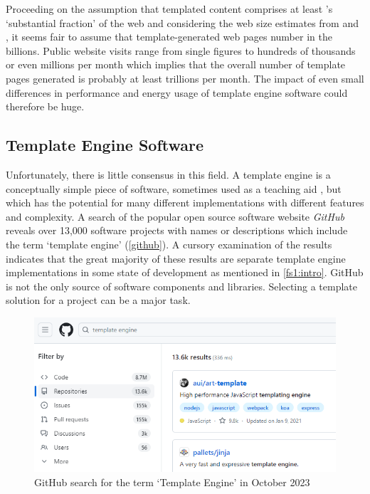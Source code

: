 Proceeding on the assumption that templated content comprises at least \citeauthor{Yang2008}'s  `substantial fraction' of the web and considering the web size estimates from \citet{Worldwidewebsize2018} and \citet{Kunder2008}, it seems fair to assume that template-generated web pages number in the billions. Public website visits range from single figures to hundreds of thousands or even millions per month \citep{Castillo2023} which implies that the overall number of template pages generated is probably at least trillions per month. The impact of even small differences in performance and energy usage of template engine software could therefore be huge.

\subsection{Template Engine Software}

Unfortunately, there is little consensus in this field. A template engine is a conceptually simple piece of software, sometimes used as a teaching aid \citep{Koskela2007}, but which has the potential for many different implementations with different features and complexity. A search of the popular open source software website \emph{GitHub} \citep{GitHubGeneral} reveals over 13,000 software projects with names or descriptions which include the term `template engine' (\autoref{github}). A cursory examination of the results indicates that the great majority of these results are separate template engine implementations in some state of development as mentioned in \autoref{fs1:intro}. GitHub is not the only source of software components and libraries. Selecting a template solution for a project can be a major task.

\begin{figure}[ht!]
\centering
\includegraphics[width=\columnwidth]{Figures/template-engines-2023.png}
\caption{GitHub search for the term `Template Engine' in October 2023}
\label{github}
\end{figure}

